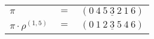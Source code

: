 \begin{example}\label{example:DOFVIMRX}
  \hfill \break
  \begin{tabular}{lll}
    $\pi$ & $=$ & $({0}~\underline{{4}~{5}~{3}~{2}~{1}}~{6})$ \\
    $\pi \cdot \rho^{(1,5)}$ & $=$ & $({0}~\underline{{1}~{2}~{3}~{5}~{4}}~{6})$ \\
  \end{tabular}
\end{example}
